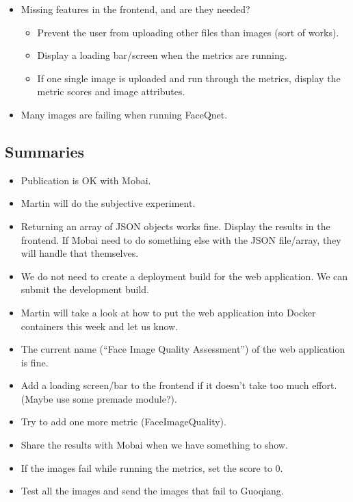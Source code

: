 \begin{itemize}
    \item Missing features in the frontend, and are they needed?
    \begin{itemize}
        \item Prevent the user from uploading other files than images (sort of works).
        \item Display a loading bar/screen when the metrics are running.
        \item If one single image is uploaded and run through the metrics, display the metric scores and image attributes.
    \end{itemize}
    \item Many images are failing when running FaceQnet. 
\end{itemize}

\subsection*{Summaries}
\begin{itemize}
    \item Publication is OK with Mobai.
    \item Martin will do the subjective experiment.
    \item Returning an array of JSON objects works fine. Display the results in the frontend. If Mobai need to do something else with the JSON file/array, they will handle that themselves.
    \item We do not need to create a deployment build for the web application. We can submit the development build.
    \item Martin will take a look at how to put the web application into Docker containers this week and let us know.
    \item The current name (“Face Image Quality Assessment”) of the web application is fine.
    \item Add a loading screen/bar to the frontend if it doesn't take too much effort. (Maybe use some premade module?).
    \item Try to add one more metric (FaceImageQuality).
    \item Share the results with Mobai when we have something to show.
    \item If the images fail while running the metrics, set the score to 0.
    \item Test all the images and send the images that fail to Guoqiang.
\end{itemize}

